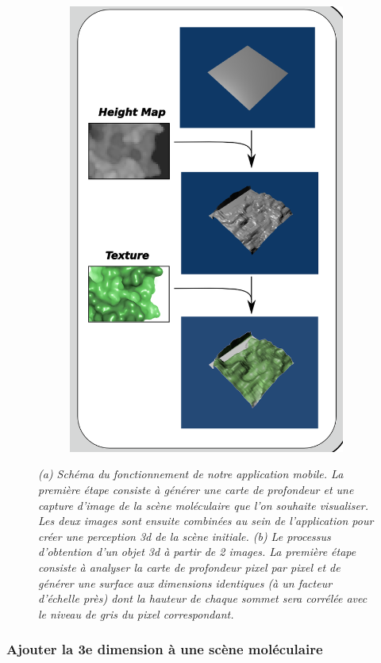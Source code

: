 \begin{figure}[h]
\begin{subfigure}{.5\textwidth}
  {\includegraphics[width=.75\linewidth]{./figures/ch3/heightmap_texture_unity}}
    \caption{}
  \label{Fig:heightmap_texture_unity}
\end{subfigure}

\caption{{\it (a) Schéma du fonctionnement de notre application mobile. La première étape consiste à générer une carte de profondeur et une capture d'image de la scène moléculaire que l'on souhaite visualiser. Les deux images sont ensuite combinées au sein de l'application pour créer une perception 3d de la scène initiale.
(b) Le processus d'obtention d'un objet 3d à partir de 2 images. La première étape consiste à analyser la carte de profondeur pixel par pixel et de générer une surface aux dimensions identiques (à un facteur d'échelle près) dont la hauteur de chaque sommet sera corrélée avec le niveau de gris du pixel correspondant.}}
\end{figure}

\subsubsection{Ajouter la 3e dimension à une scène moléculaire}

